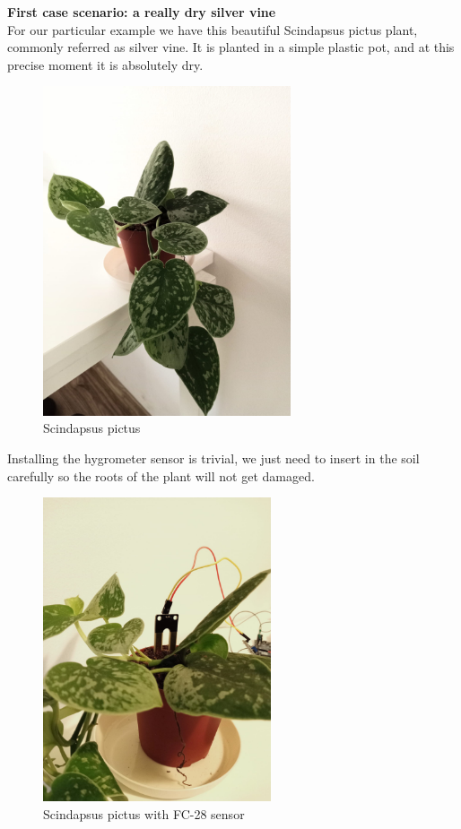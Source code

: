 \textbf{First case scenario: a really dry silver vine} \\
For our particular example we have this beautiful Scindapsus pictus plant, commonly referred as silver vine. It is planted in a simple plastic pot, and at this precise moment it is absolutely dry.

\begin{figure}[H]
    \centering
    \includegraphics[width=0.65\textwidth]{fig/silvervine.jpeg}
    \caption{Scindapsus pictus}
    \label{fig:erica}
\end{figure}


Installing the hygrometer sensor is trivial, we just need to insert in the soil carefully so the roots of the plant will not get damaged.

\begin{figure}[H]
    \centering
    \includegraphics[width=0.6\textwidth]{fig/silvervinefc28.jpg}
    \caption{Scindapsus pictus with FC-28 sensor}
    \label{fig:ericafc28}
\end{figure}


